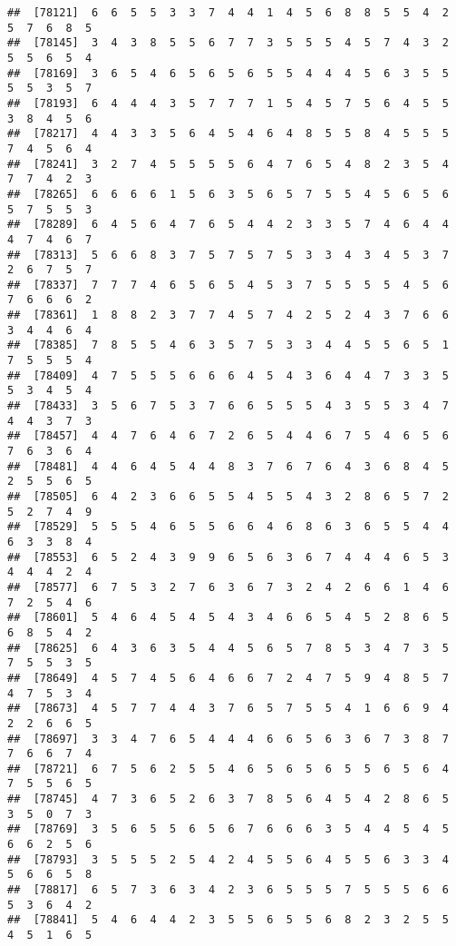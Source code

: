 \documentclass[
]{book}
\begin{document}
\begin{verbatim}
##  [78121]  6  6  5  5  3  3  7  4  4  1  4  5  6  8  8  5  5  4  2  5  7  6  8  5
##  [78145]  3  4  3  8  5  5  6  7  7  3  5  5  5  4  5  7  4  3  2  5  5  6  5  4
##  [78169]  3  6  5  4  6  5  6  5  6  5  5  4  4  4  5  6  3  5  5  5  5  3  5  7
##  [78193]  6  4  4  4  3  5  7  7  7  1  5  4  5  7  5  6  4  5  5  3  8  4  5  6
##  [78217]  4  4  3  3  5  6  4  5  4  6  4  8  5  5  8  4  5  5  5  7  4  5  6  4
##  [78241]  3  2  7  4  5  5  5  5  6  4  7  6  5  4  8  2  3  5  4  7  7  4  2  3
##  [78265]  6  6  6  6  1  5  6  3  5  6  5  7  5  5  4  5  6  5  6  5  7  5  5  3
##  [78289]  6  4  5  6  4  7  6  5  4  4  2  3  3  5  7  4  6  4  4  4  7  4  6  7
##  [78313]  5  6  6  8  3  7  5  7  5  7  5  3  3  4  3  4  5  3  7  2  6  7  5  7
##  [78337]  7  7  7  4  6  5  6  5  4  5  3  7  5  5  5  5  4  5  6  7  6  6  6  2
##  [78361]  1  8  8  2  3  7  7  4  5  7  4  2  5  2  4  3  7  6  6  3  4  4  6  4
##  [78385]  7  8  5  5  4  6  3  5  7  5  3  3  4  4  5  5  6  5  1  7  5  5  5  4
##  [78409]  4  7  5  5  5  6  6  6  4  5  4  3  6  4  4  7  3  3  5  5  3  4  5  4
##  [78433]  3  5  6  7  5  3  7  6  6  5  5  5  4  3  5  5  3  4  7  4  4  3  7  3
##  [78457]  4  4  7  6  4  6  7  2  6  5  4  4  6  7  5  4  6  5  6  7  6  3  6  4
##  [78481]  4  4  6  4  5  4  4  8  3  7  6  7  6  4  3  6  8  4  5  2  5  5  6  5
##  [78505]  6  4  2  3  6  6  5  5  4  5  5  4  3  2  8  6  5  7  2  5  2  7  4  9
##  [78529]  5  5  5  4  6  5  5  6  6  4  6  8  6  3  6  5  5  4  4  6  3  3  8  4
##  [78553]  6  5  2  4  3  9  9  6  5  6  3  6  7  4  4  4  6  5  3  4  4  4  2  4
##  [78577]  6  7  5  3  2  7  6  3  6  7  3  2  4  2  6  6  1  4  6  7  2  5  4  6
##  [78601]  5  4  6  4  5  4  5  4  3  4  6  6  5  4  5  2  8  6  5  6  8  5  4  2
##  [78625]  6  4  3  6  3  5  4  4  5  6  5  7  8  5  3  4  7  3  5  7  5  5  3  5
##  [78649]  4  5  7  4  5  6  4  6  6  7  2  4  7  5  9  4  8  5  7  4  7  5  3  4
##  [78673]  4  5  7  7  4  4  3  7  6  5  7  5  5  4  1  6  6  9  4  2  2  6  6  5
##  [78697]  3  3  4  7  6  5  4  4  4  6  6  5  6  3  6  7  3  8  7  7  6  6  7  4
##  [78721]  6  7  5  6  2  5  5  4  6  5  6  5  6  5  5  6  5  6  4  7  5  5  6  5
##  [78745]  4  7  3  6  5  2  6  3  7  8  5  6  4  5  4  2  8  6  5  3  5  0  7  3
##  [78769]  3  5  6  5  5  6  5  6  7  6  6  6  3  5  4  4  5  4  5  6  6  2  5  6
##  [78793]  3  5  5  5  2  5  4  2  4  5  5  6  4  5  5  6  3  3  4  5  6  6  5  8
##  [78817]  6  5  7  3  6  3  4  2  3  6  5  5  5  7  5  5  5  6  6  5  3  6  4  2
##  [78841]  5  4  6  4  4  2  3  5  5  6  5  5  6  8  2  3  2  5  5  4  5  1  6  5

\end{verbatim}
\end{document}
